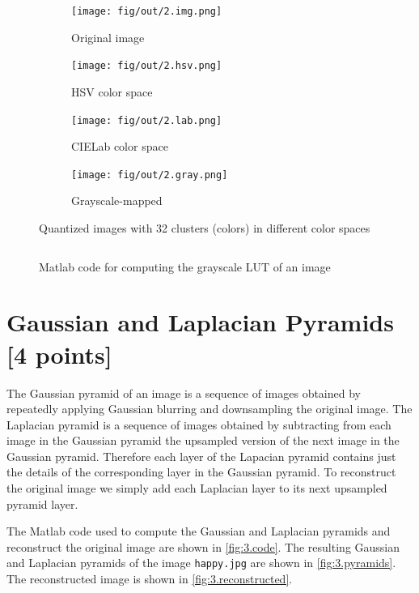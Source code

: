 \documentclass[tikz,14pt,fleqn]{article}
\begin{document}
\begin{figure}[h!]
    \begin{subfigure}[]{0.245\linewidth}
        \texttt{[image: fig/out/2.img.png]}
        \caption{Original image}
        \label{fig:2.img}
    \end{subfigure}
    \begin{subfigure}[]{0.245\linewidth}
        \texttt{[image: fig/out/2.hsv.png]}
        \caption{HSV color space}
        \label{fig:2.hsv}
    \end{subfigure}
    \begin{subfigure}[]{0.245\linewidth}
        \texttt{[image: fig/out/2.lab.png]}
        \caption{CIELab color space}
        \label{fig:2.lab}
    \end{subfigure}
    \begin{subfigure}[]{0.245\linewidth}
        \texttt{[image: fig/out/2.gray.png]}
        \caption{Grayscale-mapped}
        \label{fig:2.gray}
    \end{subfigure}
    \caption{Quantized images with 32 clusters (colors) in different color spaces}
    \label{fig:2}
\end{figure}
\begin{figure}[h!]
    \vspace*{-0.2cm}
    \inputminted[firstline=15, lastline=17, frame=lines, framesep=2mm, fontsize=\small ]{matlab}{../src/ex2.m}
    \vspace*{-0.5cm}
    \caption{Matlab code for computing the grayscale LUT of an image}
    \label{fig:2.gray.code}
\end{figure}


\section{Gaussian and Laplacian Pyramids [4 points]}
The Gaussian pyramid of an image is a sequence of images obtained by repeatedly applying Gaussian blurring and downsampling the original image. The Laplacian pyramid is a sequence of images obtained by subtracting from each image in the Gaussian pyramid the upsampled version of the next image in the Gaussian pyramid. Therefore each layer of the Lapacian pyramid contains just the details of the corresponding layer in the Gaussian pyramid. To reconstruct the original image we simply add each Laplacian layer to its next upsampled pyramid layer.

The Matlab code used to compute the Gaussian and Laplacian pyramids and reconstruct the original image are shown in \autoref{fig:3.code}. The resulting Gaussian and Laplacian pyramids of the image \verb|happy.jpg| are shown in \autoref{fig:3.pyramids}. The reconstructed image is shown in \autoref{fig:3.reconstructed}. 
\end{document}
